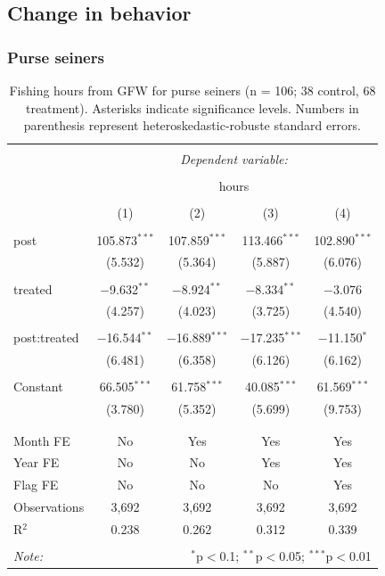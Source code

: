 \documentclass[]{article}
\begin{document}
\clearpage

\subsection{Change in behavior}\label{change-in-behavior-1}

\subsubsection{Purse seiners}\label{purse-seiners}

\begin{table}[!htbp] \centering 
  \caption{\label{tab:purse}Fishing hours from GFW for purse seiners (n = 106; 38 control, 68 treatment). Asterisks indicate significance levels. Numbers in parenthesis represent heteroskedastic-robuste standard errors.} 
  \label{} 
\begin{tabular}{@{\extracolsep{5pt}}lcccc} 
\\[-1.8ex]\hline 
\hline \\[-1.8ex] 
 & \multicolumn{4}{c}{\textit{Dependent variable:}} \\ 
\cline{2-5} 
\\[-1.8ex] & \multicolumn{4}{c}{hours} \\ 
\\[-1.8ex] & (1) & (2) & (3) & (4)\\ 
\hline \\[-1.8ex] 
 post & 105.873$^{***}$ & 107.859$^{***}$ & 113.466$^{***}$ & 102.890$^{***}$ \\ 
  & (5.532) & (5.364) & (5.887) & (6.076) \\ 
  & & & & \\ 
 treated & $-$9.632$^{**}$ & $-$8.924$^{**}$ & $-$8.334$^{**}$ & $-$3.076 \\ 
  & (4.257) & (4.023) & (3.725) & (4.540) \\ 
  & & & & \\ 
 post:treated & $-$16.544$^{**}$ & $-$16.889$^{***}$ & $-$17.235$^{***}$ & $-$11.150$^{*}$ \\ 
  & (6.481) & (6.358) & (6.126) & (6.162) \\ 
  & & & & \\ 
 Constant & 66.505$^{***}$ & 61.758$^{***}$ & 40.085$^{***}$ & 61.569$^{***}$ \\ 
  & (3.780) & (5.352) & (5.699) & (9.753) \\ 
  & & & & \\ 
\hline \\[-1.8ex] 
Month FE & No & Yes & Yes & Yes \\ 
Year FE & No & No & Yes & Yes \\ 
Flag FE & No & No & No & Yes \\ 
Observations & 3,692 & 3,692 & 3,692 & 3,692 \\ 
R$^{2}$ & 0.238 & 0.262 & 0.312 & 0.339 \\ 
\hline 
\hline \\[-1.8ex] 
\textit{Note:}  & \multicolumn{4}{r}{$^{*}$p$<$0.1; $^{**}$p$<$0.05; $^{***}$p$<$0.01} \\ 
\end{tabular} 
\end{table}
\end{document}
